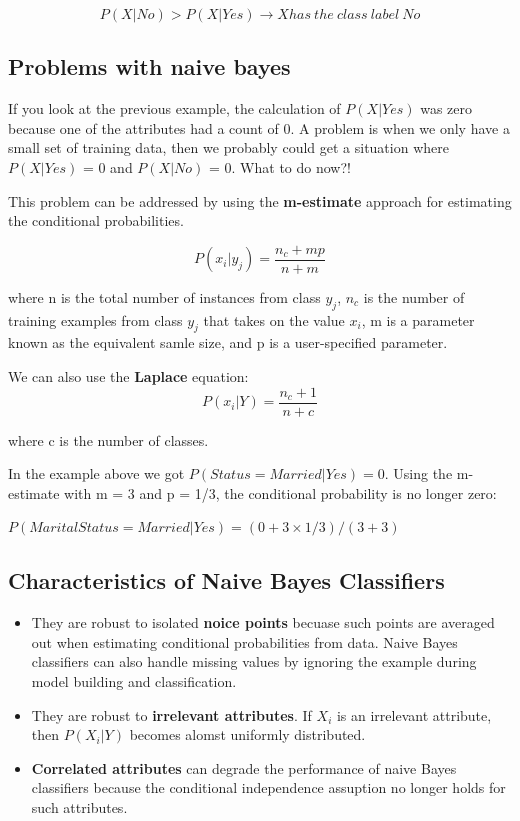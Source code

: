 				\begin{equation}
					P(X|No) > P(X|Yes) \rightarrow X has\:the\:class\:label\:No
				\end{equation}

		\subsection{Problems with naive bayes}

			If you look at the previous example, the calculation of $P(X|Yes)$ was zero
			because one of the attributes had a count of 0. A problem is when we only have 
			a small set of training data, then we probably could get a situation where
			$P(X|Yes)$ = 0 and $P(X|No)$ = 0. What to do now?!

			This problem can be addressed by using the {\bf m-estimate} approach for 
			estimating the conditional probabilities. 

			\begin{equation}
				P(x_{i}|y_{j}) = \frac{n_{c} + mp}{n+m}
			\end{equation}

			where n is the total number of instances from class $y_{j}$, 
			$n_{c}$ is the number of training examples from class $y_{j}$ that takes on the 
			value $x_{i}$, m is a parameter known as the equivalent samle size, and p is a 
			user-specified parameter.

			We can also use the {\bf Laplace} equation:
			\begin{equation}
				P(x_{i}|Y) = \frac{n_{c} +1}{n + c}
			\end{equation}

			where c is the number of classes.

			In the example above we got $P(Status = Married|Yes) = 0$. Using the m-estimate
			with m = 3 and p = 1/3, the conditional probability is no longer zero:

			$P(Marital Status = Married|Yes) = (0+3 \times 1/3)/(3+3)$


		\subsection{Characteristics of Naive Bayes Classifiers}

			\begin{itemize}
				\item They are robust to isolated {\bf noice points} becuase such points are 
				averaged out when estimating conditional probabilities from data. 
				Naive Bayes classifiers can also handle missing values by ignoring the
				example during model building and classification.
				\item They are robust to {\bf irrelevant attributes}. If $X_{i}$ is an irrelevant
				attribute, then $P(X_{i}|Y)$ becomes alomst uniformly distributed. 
				\item {\bf Correlated attributes} can degrade the performance of naive Bayes 
				classifiers because the conditional independence assuption no longer holds 
				for such attributes. 
			\end{itemize}

